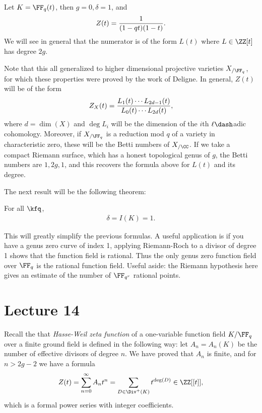 \begin{exercise}[?]

Let \(K = \FF_q(t)\), then \(g=0, \delta = 1\), and
\begin{align*}  
Z(t) = {1\over (1-qt)(1-t)}
.\end{align*} We will see in general that the numerator is of the form
\(L(t)\) where \(L\in \ZZ[t]\) has degree \(2g\).

\end{exercise}

Note that this all generalized to higher dimensional projective
varieties \(X_{/\FF_q}\), for which these properties were proved by the
work of Deligne. In general, \(Z(t)\) will be of the form
\begin{align*}  
Z_X(t) = {L_1(t) \cdots L_{2d-1}(t) \over L_0(t) \cdots L_{2d}(t)}
,\end{align*} where \(d = \dim(X)\) and \(\deg L_i\) will be the
dimension of the \(i\)th \(\ell\dash\)adic cohomology. Moreover, if
\(X_{/\FF_q}\) is a reduction mod \(q\) of a variety in characteristic
zero, these will be the Betti numbers of \(X_{/\CC}\). If we take a
compact Riemann surface, which has a honest topological genus of \(g\),
the Betti numbers are \(1, 2g, 1\), and this recovers the formula above
for \(L(t)\) and its degree.

The next result will be the following theorem:

\begin{theorem}

For all \(\kfq\),
\begin{align*}  
\delta = I(K) = 1
.\end{align*}

\end{theorem}

This will greatly simplify the previous formulas. A useful application
is if you have a genus zero curve of index 1, applying Riemann-Roch to a
divisor of degree 1 shows that the function field is rational. Thus the
only genus zero function field over \(\FF_q\) is the rational function
field. Useful aside: the Riemann hypothesis here gives an estimate of
the number of \(\FF_{q^r}\) rational points.

\hypertarget{lecture-14}{%
\section{Lecture 14}\label{lecture-14}}

Recall the that \emph{Hasse-Weil zeta function} of a one-variable
function field \(K/\FF_q\) over a finite ground field is defined in the
following way: let \(A_n = A_n(K)\) be the number of effective divisors
of degree \(n\). We have proved that \(A_n\) is finite, and for
\(n>2g-2\) we have a formula
\begin{align*}  
Z(t) = \sum_{n=0}^\infty A_n t^n
= \sum_{D\in \Div^+(K)} t^{\deg(D)} \in \ZZ[[t]]
,\end{align*} which is a formal power series with integer coefficients.

